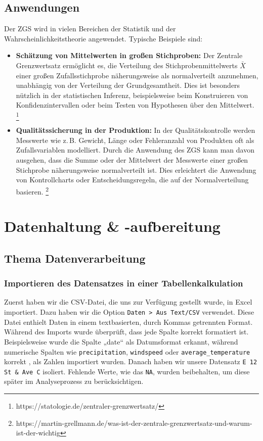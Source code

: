 \documentclass[a4paper,12pt]{article}
\begin{document}
\subsection{Anwendungen}
Der ZGS wird in vielen Bereichen der Statistik und der Wahrscheinlichkeitstheorie angewendet. Typische Beispiele sind:
\begin{itemize}
    \item \textbf{Schätzung von Mittelwerten in großen Stichproben:} Der Zentrale Grenzwertsatz ermöglicht es, die Verteilung des Stichprobenmittelwerts $\bar{X}$ einer großen Zufallsstichprobe näherungsweise als normalverteilt anzunehmen, unabhängig von der Verteilung der Grundgesamtheit. Dies ist besonders nützlich in der statistischen Inferenz, beispielsweise beim Konstruieren von Konfidenzintervallen oder beim Testen von Hypothesen über den Mittelwert. \footnote{https://statologie.de/zentraler-grenzwertsatz/} 
    \item \textbf{Qualitätssicherung in der Produktion:} In der Qualitätskontrolle werden Messwerte wie z.\,B. Gewicht, Länge oder Fehleranzahl von Produkten oft als Zufallsvariablen modelliert. Durch die Anwendung des ZGS kann man davon ausgehen, dass die Summe oder der Mittelwert der Messwerte einer großen Stichprobe näherungsweise normalverteilt ist. Dies erleichtert die Anwendung von Kontrollcharts oder Entscheidungsregeln, die auf der Normalverteilung basieren.
    \footnote{https://martin-grellmann.de/was-ist-der-zentrale-grenzwertsatz-und-warum-ist-der-wichtig}
\end{itemize}

\section{Datenhaltung \& -aufbereitung}

\subsection{Thema Datenverarbeitung}

\subsubsection{Importieren des Datensatzes in einer Tabellenkalkulation}
Zuerst haben wir die CSV-Datei, die uns zur Verfügung gestellt wurde, in Excel importiert. Dazu haben wir die Option \texttt{Daten > Aus Text/CSV} verwendet. Diese Datei enthielt Daten in einem textbasierten, durch Kommas getrennten Format. Während des Imports wurde überprüft, dass jede Spalte korrekt formatiert ist. Beispielsweise wurde die Spalte „date“ als Datumsformat erkannt, während numerische Spalten wie \texttt{precipitation}, \texttt{windspeed} oder \texttt{average\_temperature} korrekt , als Zahlen importiert wurden. Danach haben wir unsere Datensatz \texttt{E 12 St \& Ave C} isoliert. Fehlende Werte, wie das \texttt{NA}, wurden beibehalten, um diese später im Analyseprozess zu berücksichtigen.
\end{document}

